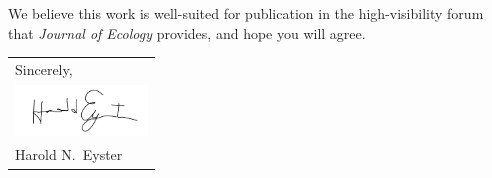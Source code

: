 \documentclass[11pt]{article}
\begin{document}
	We believe this work is well-suited for publication in the high-visibility forum that \textit{Journal of Ecology} provides, and hope you will agree. \\  %
	\null\hfill
	\begin{tabular}{l@{}}
		Sincerely, \\[1\normalbaselineskip] %
		\includegraphics[width=100pt]{sig}\\
		Harold N.\ Eyster
	\end{tabular}
	
\end{document}
